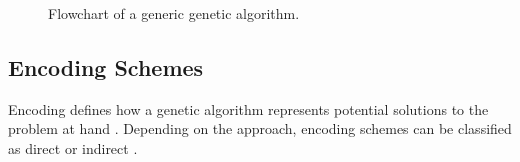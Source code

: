 \documentclass[english,examples]{isasthesis}
\begin{document}






\begin{figure}[h]
    \centering
    

    \caption{Flowchart of a generic genetic algorithm.}
    \label{fig:ga_flowchart}
\end{figure}


\subsection{Encoding Schemes}
Encoding defines how a genetic algorithm represents potential solutions to
the problem at hand \cite{Affenzeller2009}.
Depending on the approach, encoding schemes can be classified as direct or
indirect \cite{Thanh2007}.
\end{document}
